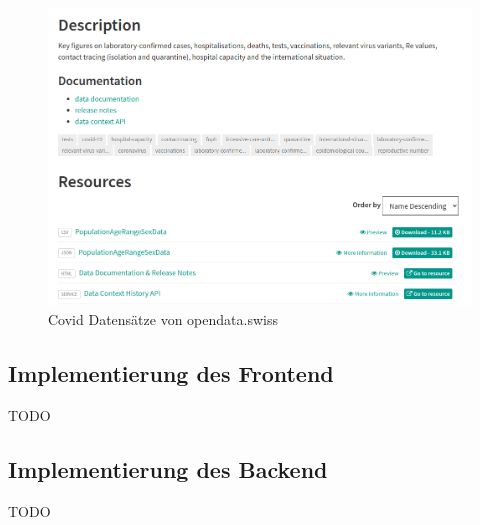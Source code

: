 \begin{figure}[h]
    \includegraphics[width=12cm]{images/covid_data_set.png}
    \centering
    \caption{Covid Datensätze von opendata.swiss ~\citep{covid19_open_data}}
    \label{fig:covid19_open_data}
\end{figure}

\subsection{Implementierung des Frontend}
TODO

\subsection{Implementierung des Backend}
TODO
